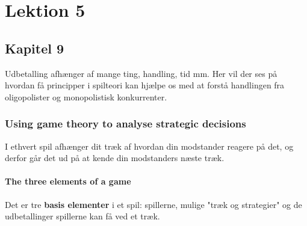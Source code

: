 \chapter{Lektion 5}

\section{Kapitel 9}
Udbetalling afhænger af mange ting, handling, tid mm. Her vil der ses på hvordan få principper i spilteori kan hjælpe os med at forstå handlingen fra oligopolister og monopolistisk konkurrenter. 

\subsection{Using game theory to analyse strategic decisions}
I ethvert spil afhænger dit træk af hvordan din modstander reagere på det, og derfor går det ud på at kende din modstanders næste træk. 

\subsubsection{The three elements of a game}
Det er tre \textbf{basis elementer} i et spil: spillerne, mulige "træk og strategier" og de udbetallinger spillerne kan få ved et træk. 

